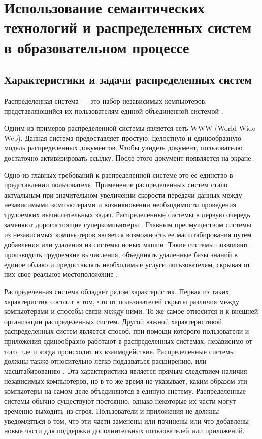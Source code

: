 \chapter{Использование семантических технологий и распределенных систем в образовательном процессе} \label{chapt1}


\section{Характеристики и задачи распределенных систем} \label{sect1_1}

Распределенная система — это набор независимых компьютеров, представляющийся их пользователям единой объединенной системой \cite{tanenboum2003raspr}.

Одним из примеров  распределенной системы является сеть WWW (World Wide Web). Данная система предоставляет простую, целостную и единообразную модель распределенных документов. Чтобы увидеть документ, пользователю достаточно активизировать ссылку. После этого документ появляется на экране. 

Одно из главных требований к распределенной системе это ее единство в представлении пользователя. Применение распределенных систем стало актуальным при значительном увеличении скорости передачи данных между независимыми компьютерами и возникновении необходимости проведения трудоемких вычислительных задач. Распределенные системы в первую очередь заменяют дорогостоящие суперкомпьютеры \cite{shokin1998raspr}. Главным преимуществом системы из независимых компьютеров является возможность ее масштабирования путем добавления или удаления из системы новых машин. Такие системы позволяют производить трудоемкие вычисления, объединять удаленные базы знаний в единое облако и предоставлять необходимые услуги пользователям, скрывая от них свое реальное местоположение \cite{wang2010distributed}.

Распределенная система обладает рядом характеристик. Первая из таких характеристик состоит в том, что от пользователей скрыты различия между компьютерами и способы связи между ними. То же самое относится и к внешней организации распределенных систем. Другой важной характеристикой распределенных систем является способ, при помощи которого пользователи и приложения единообразно работают в распределенных системах, независимо от того, где и когда происходит их взаимодействие. Распределенные системы должны также относительно легко поддаваться расширению, или масштабированию \cite{coulouris2005distributed}. Эта характеристика является прямым следствием наличия независимых компьютеров, но в то же время не указывает, каким образом эти компьютеры на самом деле объединяются в единую систему. Распределенные системы обычно существуют постоянно, однако некоторые их части могут временно выходить из строя. Пользователи и приложения не должны уведомляться о том, что эти части заменены или починены или что добавлены новые части для поддержки дополнительных пользователей или приложений.

